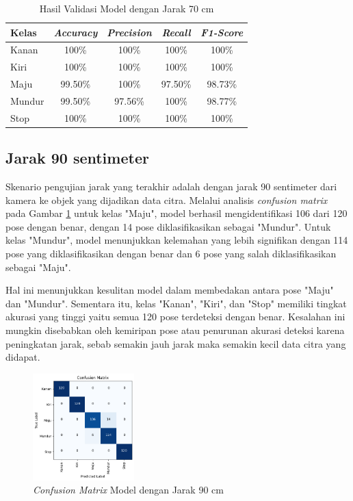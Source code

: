\begin{longtable}{|l|c|c|c|c|}
  \caption{Hasil Validasi Model dengan Jarak 70 cm}
  \label{tb:vs_model5} \\
  \hline
  \rowcolor[HTML]{C0C0C0} 
  \textbf{Kelas} & \textbf{\emph{Accuracy}} & \textbf{\emph{Precision}} & \textbf{\emph{Recall}} & \textbf{\emph{F1-Score}} \\ \hline
  Kanan    & 100\%            & 100\%             & 100\%           & 100\%            \\ \hline
  Kiri     & 100\%          & 100\%           & 100\%           & 100\%           \\ \hline
  Maju      & 99.50\%          & 100\%           & 97.50\%          & 98.73\%          \\ \hline
  Mundur     & 99.50\%            & 97.56\%             & 100\%           & 98.77\%            \\ \hline
  Stop  & 100\%            & 100\%             & 100\%           & 100\%            \\ \hline
\end{longtable}

\subsection{Jarak 90 sentimeter}

Skenario pengujian jarak yang terakhir adalah dengan jarak 90 sentimeter dari kamera ke objek yang dijadikan data citra. Melalui analisis \emph{confusion matrix} pada Gambar \ref{fig:matrix6} untuk kelas "Maju", model berhasil mengidentifikasi 106 dari 120 pose dengan benar, dengan 14 pose diklasifikasikan sebagai "Mundur". Untuk kelas "Mundur", model menunjukkan kelemahan yang lebih signifikan dengan 114 pose yang diklasifikasikan dengan benar dan 6 pose yang salah diklasifikasikan sebagai "Maju". 

Hal ini menunjukkan kesulitan model dalam membedakan antara pose "Maju" dan "Mundur". Sementara itu, kelas "Kanan", "Kiri", dan "Stop" memiliki tingkat akurasi yang tinggi yaitu semua 120 pose terdeteksi dengan benar. Kesalahan ini mungkin disebabkan oleh kemiripan pose atau penurunan akurasi deteksi karena peningkatan jarak, sebab semakin jauh jarak maka semakin kecil data citra yang didapat. 
  
\begin{figure} [H] \centering
  \includegraphics[width=0.35\textwidth]{gambar/bab4/model8 (90cm)/confusion.png}
  \caption{\emph{Confusion Matrix} Model dengan Jarak 90 cm}
  \label{fig:matrix6}
\end{figure}

